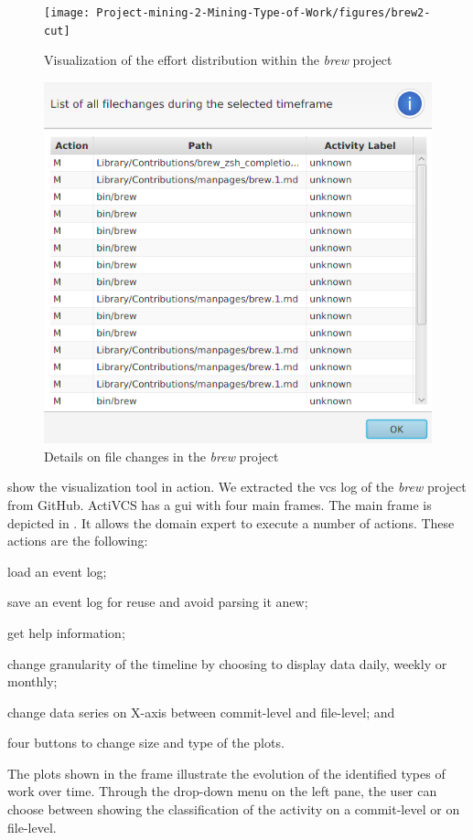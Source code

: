 \begin{figure}
    \centering
    \texttt{[image: Project-mining-2-Mining-Type-of-Work/figures/brew2-cut]}
    \caption{Visualization of the effort distribution within the \textsl{brew} project}
    \label{fig:brew2}
\end{figure}

\begin{figure}
    \centering
    \includegraphics[width=.7\textwidth]{Project-mining-2-Mining-Type-of-Work/figures/brew1-cut}
    \caption{Details on file changes in the \textsl{brew} project}
    \label{fig:brew1}
\end{figure}


 show the visualization tool in action. We extracted the \gls{vcs} log of the \textsl{brew} project from GitHub. ActiVCS has a \gls{gui} with four main frames. The main frame is depicted in . It allows the domain expert to execute a number of actions. These actions are the following: \begin{inparaenum}[\itshape i)] 
\item load an event log; 
\item save an event log for reuse and avoid parsing it anew;
\item get help information;
\item change granularity of the timeline by choosing to display data daily, weekly or monthly; 
\item change data series on X-axis between commit-level and file-level; and
\item four buttons to change size and type of the plots.
\end{inparaenum}
The plots shown in the frame illustrate the evolution of the identified types of work over time. Through the drop-down menu on the left pane, the user can choose between showing the classification of the activity on a commit-level or on file-level.  

